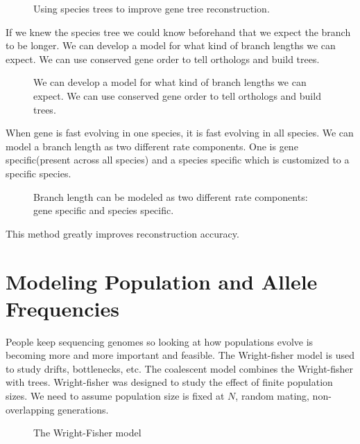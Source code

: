 \begin{figure}[ht!]
  \centering
  \caption{Using species trees to improve gene tree reconstruction.} 
  \label{Fig10_LearningAcrossGeneTrees}
\end{figure}

If we knew the species tree we could know beforehand that we expect
the branch to be longer. We can develop a model for what kind of
branch lengths we can expect. We can use conserved gene order to tell
orthologs and build trees.

\begin{figure}[ht!]
  \centering
  \caption{We can develop a model for what kind of branch lengths we
    can expect. We can use conserved gene order to tell orthologs and
    build trees.}
  \label{Fig11_DevelopingRatesModel}
\end{figure}

When gene is fast evolving in one species, it is fast evolving in all
species. We can model a branch length as two different rate
components. One is gene specific(present across all species) and a
species specific which is customized to a specific species.

\begin{figure} [ht!] 
  \centering
  \caption{Branch length can be modeled as two different rate
    components: gene specific and species specific.}
  \label{Fig12_UsingRateModels}
\end{figure} 

\noindent This method greatly improves reconstruction accuracy.

\section{Modeling Population and Allele Frequencies}
People keep sequencing genomes so looking at how populations evolve is
becoming more and more important and feasible. The Wright-fisher model
is used to study drifts, bottlenecks, etc. The coalescent model
combines the Wright-fisher with trees. Wright-fisher was designed to
study the effect of finite population sizes. We need to assume
population size is fixed at $N$, random mating, non-overlapping
generations.

\begin{figure} [ht!] 
  \centering 
  \caption{The Wright-Fisher model}
  \label{Fig13_FisherWrightModel}
\end{figure} 


